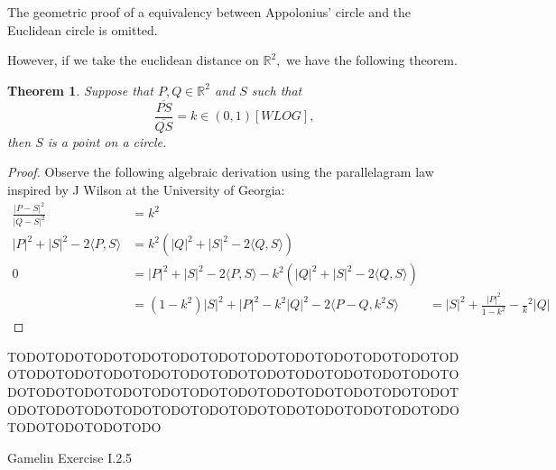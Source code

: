 \documentclass[letter]{article}
\newtheorem{theorem}{Theorem}
\newenvironment{menumerate}{%
  \edef\backupindent{\the\parindent}%
  \enumerate%
  \setlength{\parindent}{\backupindent}%
}{\endenumerate}
\begin{document}
\begin{menumerate}
        The geometric proof of a equivalency between Appolonius' circle and the
        Euclidean circle is omitted.

        However, if we take the euclidean distance on $\mathbb{R}^2,$ we have the following theorem.
        \begin{theorem}
            Suppose that $P,Q \in \mathbb{R}^2$ and $S$ such that 
            $$\frac{\overline{PS}}{\overline{QS}} = k \in (0,1)[WLOG],$$
            then $S$ is a point on a circle.
        \end{theorem}
        \begin{proof}
            Observe the following algebraic derivation using the parallelagram law inspired by J Wilson at the University of Georgia:
            \begin{equation}
                \begin{aligned}
                    \frac{|P-S|^2}{|Q-S|^2} &= k^2 \\
                     |P|^2 + |S|^2 -2\langle P, S \rangle &= k^2(|Q|^2 + |S|^2 - 2\langle Q,S\rangle ) \\
                     0&= |P|^2 + |S|^2 -2\langle P, S \rangle - k^2(|Q|^2 + |S|^2 - 2\langle Q,S\rangle ) \\
                     &= (1-k^2)|S|^2 + |P|^2 -k^2|Q|^2 -2\langle P - Q, k^2S \rangle
                     &= |S|^2 + \frac{|P|^2}{1-k^2} - \frac{}k^2|Q|
                \end{aligned}
            \end{equation}
        \end{proof}
        TODOTODOTODOTODOTODOTODOTODOTODOTODOTODOTODOTODOTODOTODOTODOTODOTODOTODOTODOTODOTODOTODOTODOTODOTODOTODOTODOTODOTODOTODOTODOTODOTODOTODOTODOTODOTODOTODOTODOTODOTODOTODOTODOTODOTODOTODOTODOTODOTODOTODOTODO

        \item Gamelin Exercise I.2.5


\end{menumerate}
\end{document}
